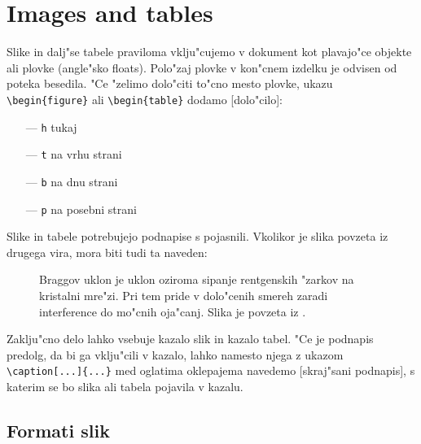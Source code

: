 \chapter{Images and tables}
\label{ch3}

Slike in dalj"se tabele praviloma vklju"cujemo v dokument kot 
plavajo"ce objekte ali plovke (angle"sko floats).
Polo"zaj plovke v kon"cnem izdelku je odvisen od poteka besedila.
"Ce "zelimo dolo"citi to"cno mesto plovke, ukazu \verb|\begin{figure}|
ali \verb|\begin{table}| dodamo [dolo"cilo]:

\begin{itemize}
\item[---]{{\tt h} \hspace{1cm} tukaj}
\item[---]{{\tt t} \hspace{1cm} na vrhu strani}
\item[---]{{\tt b} \hspace{1cm} na dnu strani}
\item[---]{{\tt p} \hspace{1cm} na posebni strani}
\end{itemize}

\noindent
Slike in tabele potrebujejo podnapise s pojasnili.  Vkolikor je slika 
povzeta iz drugega vira, mora biti tudi ta naveden:

\begin{figure}[h]
\begin{center}
\end{center}
\caption[Braggov uklon.]{Braggov uklon je uklon oziroma sipanje 
rentgenskih "zarkov na kristalni mre"zi. Pri tem pride v dolo"cenih 
smereh zaradi interference do mo"cnih oja"canj. 
Slika je povzeta iz \cite{Bragg}.}
\label{pic1}
\end{figure}


Zaklju"cno delo lahko vsebuje kazalo slik in kazalo tabel. 
"Ce je podnapis predolg, da bi ga vklju"cili v kazalo, lahko 
namesto njega z ukazom \verb|\caption[...]{...}| med oglatima
oklepajema navedemo [skraj"sani podnapis], s katerim se bo slika 
ali tabela pojavila v kazalu.

\newpage
\section{Formati slik}


